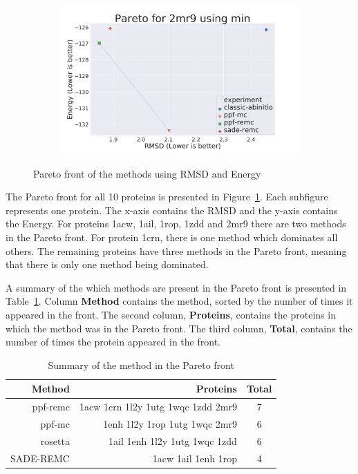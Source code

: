 \begin{figure}
\begin{subfigure}{0.49\linewidth}
  \end{subfigure}
%
  \begin{subfigure}{0.49\linewidth}
    \includegraphics[width=1\linewidth]{Figuras/pareto/2mr9_best_by_rmsd_min.pdf}
  \end{subfigure}
  \caption{Pareto front of the methods using RMSD and Energy}
  \label{fig:pareto-front}
\end{figure}

The Pareto front for all 10 proteins is presented in
Figure~\ref{fig:pareto-front}. Each subfigure represents one protein.
The x-axis contains the RMSD and the y-axis contains the Energy. For proteins 1acw,
1ail, 1rop, 1zdd and 2mr9 there are two methods in the Pareto front. For
protein 1crn, there is one method which dominates all others. The remaining
proteins have three methods in the Pareto front, meaning that there is only one
method being dominated.

A summary of the which methods are present in the Pareto front is presented
in Table~\ref{tab:pareto-front-summary}. Column \textbf{Method} contains the method,
sorted by the number of times it appeared in the front. The second column,
\textbf{Proteins}, contains the proteins in which the method was in the Pareto front.
The third column, \textbf{Total}, contains the number of times the protein appeared in the
front.

\begin{table}
  \centering
  \begin{tabular}{r | r | c}
    Method    & Proteins                           & Total \\ \hline \hline
    ppf-remc  & 1acw 1crn 1l2y 1utg 1wqc 1zdd 2mr9 & 7     \\ \hline
    ppf-mc    & 1enh 1l2y 1rop 1utg 1wqc 2mr9      & 6     \\ \hline
    rosetta   & 1ail 1enh 1l2y 1utg 1wqc 1zdd      & 6     \\ \hline
    SADE-REMC & 1acw 1ail 1enh 1rop                & 4     \\
  \end{tabular}
  \caption{Summary of the method in the Pareto front}
  \label{tab:pareto-front-summary}
\end{table}

